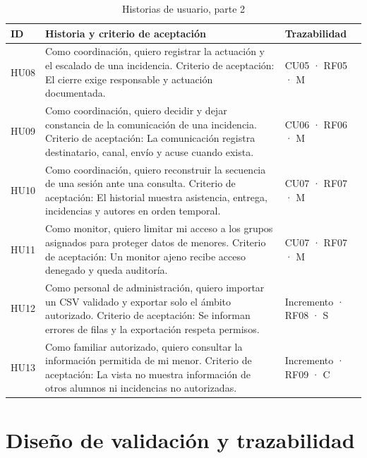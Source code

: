 \begin{table}[H]
\centering\small
\begin{tabularx}{\textwidth}{>{\hsize=0.200\hsize\raggedright\arraybackslash}X>{\hsize=2.194\hsize\raggedright\arraybackslash}X>{\hsize=0.606\hsize\raggedright\arraybackslash}X}
\toprule
\rowcolor{cabeceratabla} \textbf{ID} & \textbf{Historia y criterio de aceptación} & \textbf{Trazabilidad} \\
\midrule
HU08 & Como coordinación, quiero registrar la actuación y el escalado de una incidencia. \newline Criterio de aceptación: El cierre exige responsable y actuación documentada. & CU05 · RF05 · M \\
HU09 & Como coordinación, quiero decidir y dejar constancia de la comunicación de una incidencia. \newline Criterio de aceptación: La comunicación registra destinatario, canal, envío y acuse cuando exista. & CU06 · RF06 · M \\
HU10 & Como coordinación, quiero reconstruir la secuencia de una sesión ante una consulta. \newline Criterio de aceptación: El historial muestra asistencia, entrega, incidencias y autores en orden temporal. & CU07 · RF07 · M \\
HU11 & Como monitor, quiero limitar mi acceso a los grupos asignados para proteger datos de menores. \newline Criterio de aceptación: Un monitor ajeno recibe acceso denegado y queda auditoría. & CU07 · RF07 · M \\
HU12 & Como personal de administración, quiero importar un CSV validado y exportar solo el ámbito autorizado. \newline Criterio de aceptación: Se informan errores de filas y la exportación respeta permisos. & Incremento · RF08 · S \\
HU13 & Como familiar autorizado, quiero consultar la información permitida de mi menor. \newline Criterio de aceptación: La vista no muestra información de otros alumnos ni incidencias no autorizadas. & Incremento · RF09 · C \\
\bottomrule
\end{tabularx}
\caption{Historias de usuario, parte 2}\label{tab:38}
\end{table}

\section{Diseño de validación y trazabilidad}\label{sec:4-5}

